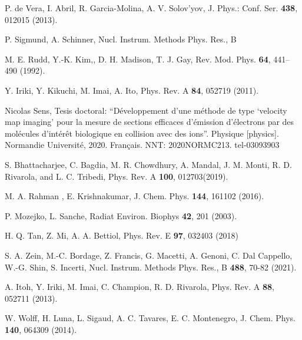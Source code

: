 \begin{thebibliography}{9}
P. de Vera, I. Abril, R. Garcia-Molina, A. V. Solov'yov,
J. Phys.: Conf. Ser. \textbf{438}, 012015 (2013).

P. Sigmund, A. Schinner,
Nucl. Instrum. Methods Phys. Res., B \textbf{}

M. E. Rudd, Y.-K. Kim,, D. H. Madison, T. J. Gay,
Rev. Mod. Phys. \textbf{64}, 441--490 (1992).

Y. Iriki, Y. Kikuchi, M. Imai, A. Ito,
Phys. Rev. A \textbf{84}, 052719 (2011).

Nicolas Sens, Tesis doctoral:
``Développement d’une méthode de type `velocity map imaging' pour la 
mesure de sections efficaces d’émission d’électrons par des molécules 
d’intérêt biologique en collision avec des ions''. 
Physique [physics]. Normandie Université, 2020. Français. 
NNT: 2020NORMC213. tel-03093903

S. Bhattacharjee, C. Bagdia, M. R. Chowdhury, A. Mandal, J. M. Monti, 
R. D. Rivarola, and L. C. Tribedi, 
Phys. Rev. A \textbf{100}, 012703(2019).

M. A. Rahman , E. Krishnakumar,
J. Chem. Phys. \textbf{144}, 161102 (2016).

P. Mozejko, L. Sanche, 
Radiat Environ. Biophys \textbf{42}, 201 (2003).

H. Q. Tan, Z. Mi, A. A. Bettiol, 
Phys. Rev. E \textbf{97}, 032403 (2018)

S. A. Zein, M.-C. Bordage, Z. Francis, G. Macetti, A. Genoni, 
C. Dal Cappello, W.-G. Shin, S. Incerti,
Nucl. Instrum. Methods Phys. Res., B \textbf{488}, 70-82 (2021).

A. Itoh, Y. Iriki, M. Imai, C. Champion, R. D. Rivarola, 
Phys. Rev. A \textbf{88}, 052711 (2013).

W. Wolff, H. Luna, L. Sigaud, A. C. Tavares, E. C. Montenegro,
J. Chem. Phys. \textbf{140}, 064309 (2014).


\end{thebibliography}
